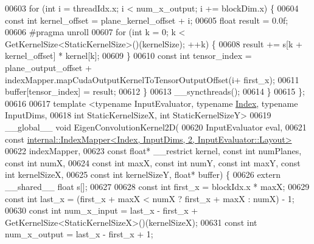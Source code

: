 \begin{DoxyCode}
00603     \textcolor{keywordflow}{for} (\textcolor{keywordtype}{int} i = threadIdx.x; i < num\_x\_output; i += blockDim.x) \{
00604       \textcolor{keyword}{const} \textcolor{keywordtype}{int} kernel\_offset = plane\_kernel\_offset + i;
00605       \textcolor{keywordtype}{float} result = 0.0f;
00606 \textcolor{preprocessor}{      #pragma unroll}
00607       \textcolor{keywordflow}{for} (\textcolor{keywordtype}{int} k = 0; k < GetKernelSize<StaticKernelSize>()(kernelSize); ++k) \{
00608         result += s[k + kernel\_offset] * kernel[k];
00609       \}
00610       \textcolor{keyword}{const} \textcolor{keywordtype}{int} tensor\_index = plane\_output\_offset + indexMapper.mapCudaOutputKernelToTensorOutputOffset(i+
      first\_x);
00611       buffer[tensor\_index] = result;
00612     \}
00613     \_\_syncthreads();
00614   \}
00615 \};
00616 
00617 \textcolor{keyword}{template} <\textcolor{keyword}{typename} InputEvaluator, \textcolor{keyword}{typename} \hyperlink{namespace_eigen_a62e77e0933482dafde8fe197d9a2cfde}{Index}, \textcolor{keyword}{typename} InputDims,
00618           \textcolor{keywordtype}{int} StaticKernelSizeX, \textcolor{keywordtype}{int} StaticKernelSizeY>
00619 \_\_global\_\_ \textcolor{keywordtype}{void} EigenConvolutionKernel2D(
00620     InputEvaluator eval,
00621     \textcolor{keyword}{const} \hyperlink{class_eigen_1_1internal_1_1_index_mapper}{internal::IndexMapper<Index, InputDims, 2, InputEvaluator::Layout>}
00622         indexMapper,
00623     \textcolor{keyword}{const} \textcolor{keywordtype}{float}* \_\_restrict kernel, \textcolor{keyword}{const} \textcolor{keywordtype}{int} numPlanes, \textcolor{keyword}{const} \textcolor{keywordtype}{int} numX,
00624     \textcolor{keyword}{const} \textcolor{keywordtype}{int} maxX, \textcolor{keyword}{const} \textcolor{keywordtype}{int} numY, \textcolor{keyword}{const} \textcolor{keywordtype}{int} maxY, \textcolor{keyword}{const} \textcolor{keywordtype}{int} kernelSizeX,
00625     \textcolor{keyword}{const} \textcolor{keywordtype}{int} kernelSizeY, \textcolor{keywordtype}{float}* buffer) \{
00626   \textcolor{keyword}{extern} \_\_shared\_\_ \textcolor{keywordtype}{float} s[];
00627 
00628   \textcolor{keyword}{const} \textcolor{keywordtype}{int} first\_x = blockIdx.x * maxX;
00629   \textcolor{keyword}{const} \textcolor{keywordtype}{int} last\_x = (first\_x + maxX < numX ? first\_x + maxX : numX) - 1;
00630   \textcolor{keyword}{const} \textcolor{keywordtype}{int} num\_x\_input = last\_x - first\_x + GetKernelSize<StaticKernelSizeX>()(kernelSizeX);
00631   \textcolor{keyword}{const} \textcolor{keywordtype}{int} num\_x\_output = last\_x - first\_x + 1;

\end{DoxyCode}
